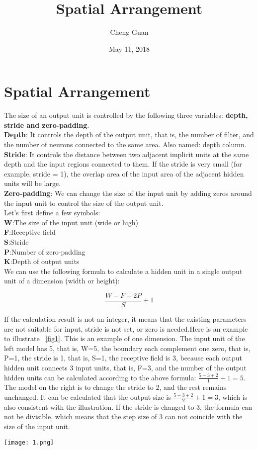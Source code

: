\documentclass[a4paper,twocolumn]{article}
\title{Spatial Arrangement}
\author{Cheng Guan}
\date{May 11, 2018}
\begin{document}
\maketitle
\balance
\section{Spatial Arrangement}
The size of an output unit is controlled by the following three variables: \textbf{depth, stride and zero-padding}.\\
\textbf{Depth}: It controls the depth of the output unit, that is, the number of filter, and the number of neurons connected to the same area. Also named: depth column.\\
\textbf{Stride}: It controls the distance between two adjacent implicit units at the same depth and the input regions connected to them. If the stride is very small (for example, stride = 1), the overlap area of the input area of the adjacent hidden units will be large.\\
\textbf{Zero-padding}: We can change the size of the input unit by adding zeros around the input unit to control the size of the output unit.\\
Let's first define a few symbols:\\
\textbf{W}:The size of the input unit (wide or high)\\
\textbf{F}:Receptive field\\
\textbf{S}:Stride \\
\textbf{P}:Number of zero-padding\\
\textbf{K}:Depth of output units\\

We can use the following formula to calculate a hidden unit in a single output unit of a dimension (width or height):
\begin{center}
    \begin{equation}
    \frac{W-F+2P}{S}+1
    \end{equation}
\end{center}

If the calculation result is not an integer,
it means that the existing parameters are not suitable for input, stride is not set, or zero is needed.Here is an example to illustrate ~\ref{fig1}.
This is an example of one dimension. The input unit of the left model has 5,
that is, W=5, the boundary each complement one zero, that is, P=1, the stride is 1,
that is, S=1, the receptive field is 3,
because each output hidden unit connects 3 input units, that is, F=3,
and the number of the output hidden units can be calculated according to the above formula: $\frac{5-3+2}{1}+1=5$.
The model on the right is to change the stride to 2, and the rest remains unchanged.
It can be calculated that the output size is $\frac{5-3+2}{2}+1=3$, which is also consistent with the illustration.
If the stride is changed to 3,
the formula can not be divisible, which means that the step size of 3 can not coincide with the size of the input unit.\cite{test2}

\begin{figure*}[htbp]
\centering
\texttt{[image: 1.png]}
\caption{Example of Illustration}
\label{fig1}
\end{figure*}


\end{document}
